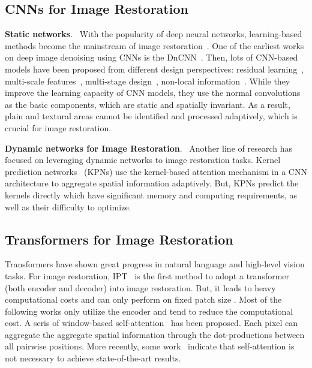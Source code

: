 \documentclass[default,iicol]{sn-jnl}
\theoremstyle{thmstyleone}\newtheorem{theorem}{Theorem}\newtheorem{proposition}[theorem]{Proposition}
\theoremstyle{thmstyletwo}\newtheorem{example}{Example}\newtheorem{remark}{Remark}
\theoremstyle{thmstylethree}\newtheorem{definition}{Definition}
\begin{document}
\subsection{CNNs for Image Restoration}
\noindent\textbf{Static networks}.~
With the popularity of deep neural networks, learning-based methods become the mainstream of image restoration~\cite{zhang2020rdn,zamir2020mirnet,Zamir2021MPRNet,chen2022nafnet,cho2021rethinking_mimo,dasongBlurRepresentaion,GroupShift,ntire2019_denoising,ntire2019_superresolution,nah2021ntire}.
One of the earliest works on deep image denoising using CNNs is the DnCNN~\cite{DnCNN}. Then, lots of CNN-based models have been proposed from different design perspectives:
residual learning~\cite{RIDNet,RCAN}, multi-scale features~\cite{zamir2020mirnet}, multi-stage design~\cite{Zamir2021MPRNet,BurstRawVS}, non-local information~\cite{zhang2019residual,plotz2018N3Net}.
While they improve the learning capacity of CNN models, they use the normal convolutions as the basic components, which are static and spatially invariant. As a result, plain and textural areas cannot be identified and processed adaptively, which is crucial for image restoration.

\noindent\textbf{Dynamic networks for Image Restoration}.~
Another line of research has focused on leveraging dynamic networks to image restoration tasks.
Kernel prediction networks~\cite{kpn,mckpn, xia2020bpn,malleconv} (KPNs) use the kernel-based attention mechanism in a CNN architecture to aggregate spatial information adaptively. But, KPNs predict the kernels directly which have significant memory and computing requirements, as well as their difficulty to optimize.
\subsection{Transformers for Image Restoration}
Transformers have shown great progress in natural language and high-level vision tasks.
For image restoration, IPT~\cite{chen2021IPT} is the first method to adopt a transformer (both encoder and decoder) into image restoration. But, it leads to heavy computational costs and can only perform on fixed patch size . Most of the following works only utilize the encoder and tend to reduce the computational cost. A seris of window-based self-attention~\cite{liang2021swinir,wang2021uformer,tu2022maxim} has been proposed. 
Each pixel can aggregate the aggregate spatial information through the dot-productions between all pairwise positions.
More recently, some work~\cite{liu2022convnext,han2021connection,replknet,chen2022nafnet} indicate that self-attention is not necessary to achieve state-of-the-art results.
  
\end{document}
